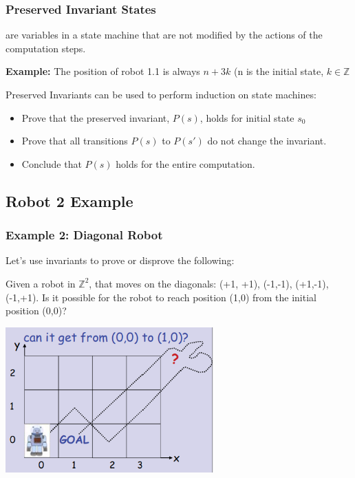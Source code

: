 \documentclass{beamer}
\begin{document}
\begin{frame}
  \frametitle{Preserved Invariant States}

  {\larger
   are variables in a state machine
  that are not modified by the actions of the computation steps.

  \bigskip

  {\bf Example:} The position of robot 1.1 is always $n+3k$ (n is the
  initial state, $k \in \mathbb{Z}$

  \bigskip
  
  Preserved Invariants can be used to perform induction on state
  machines:
  \begin{itemize}
    \item Prove that the preserved invariant, $P(s)$, holds for
      initial state $s_0$
    \item Prove that all transitions $P(s)$ to $P(s')$ do not change
      the invariant.
    \item Conclude that $P(s)$ holds for the entire computation. 
  \end{itemize}

  }
\end{frame}

\subsection{Robot 2 Example}

\begin{frame}
  \frametitle{Example 2: Diagonal Robot}

  {\larger
    Let's use invariants to prove or disprove the following:

    \bigskip

    Given a robot in $\mathbb{Z}^2$, that moves on the diagonals: (+1,
    +1), (-1,-1), (+1,-1), (-1,+1). Is it possible for the robot to
    reach position (1,0) from the initial position (0,0)?

    \begin{center}
      \includegraphics[width=0.6\textwidth]{../img/diag_robot}
    \end{center}
    
  }
\end{frame} 
\end{document}
